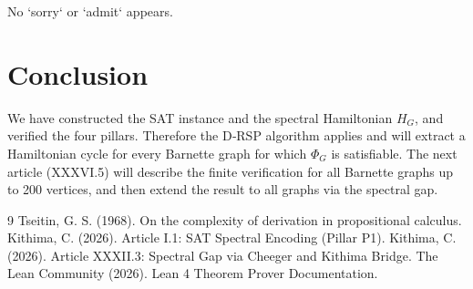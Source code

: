 \documentclass[11pt,a4paper]{article}
\begin{document}
No `sorry` or `admit` appears.

\section{Conclusion}

We have constructed the SAT instance and the spectral Hamiltonian \(H_G\), and verified the four pillars. Therefore the D‑RSP algorithm applies and will extract a Hamiltonian cycle for every Barnette graph for which \(\Phi_G\) is satisfiable. The next article (XXXVI.5) will describe the finite verification for all Barnette graphs up to 200 vertices, and then extend the result to all graphs via the spectral gap.


\begin{thebibliography}{9}
  Tseitin, G. S. (1968). On the complexity of derivation in propositional calculus.
  Kithima, C. (2026). Article I.1: SAT Spectral Encoding (Pillar P1).
  Kithima, C. (2026). Article XXXII.3: Spectral Gap via Cheeger and Kithima Bridge.
  The Lean Community (2026). Lean 4 Theorem Prover Documentation.
\end{thebibliography}
\end{document}
